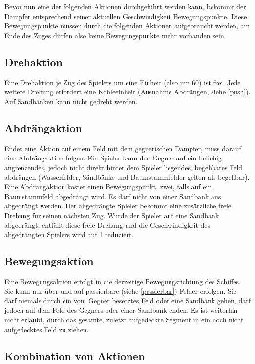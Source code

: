 \documentclass[12pt,a4paper, ngerman, oneside]{scrartcl}
\begin{document}
Bevor nun eine der folgenden Aktionen durchgeführt werden kann, bekommt der
Dampfer entsprechend seiner aktuellen Geschwindigkeit Bewegungspunkte. Diese
Bewegungspunkte müssen durch die folgenden Aktionen aufgebraucht werden, am Ende
des Zuges dürfen also keine Bewegungspunkte mehr vorhanden sein.

\subsection{\label{turn}Drehaktion}

Eine Drehaktion je Zug des Spielers um eine Einheit (also um 60\degree) ist
frei. Jede weitere Drehung erfordert eine Kohleeinheit (Ausnahme Abdrängen,
siehe \ref{push}). Auf Sandbänken kann nicht gedreht werden.


\subsection{\label{push}Abdrängaktion}

Endet eine Aktion auf einem Feld mit dem gegnerischen Dampfer, muss darauf eine
Abdrängaktion folgen. Ein Spieler kann den Gegner auf ein beliebig angrenzendes,
jedoch nicht direkt hinter dem Spieler liegendes, begehbares Feld abdrängen
(\label{passierbar}Wasserfelder, Sändbänke und Baumstammfelder gelten als
begehbar). Eine Abdrängaktion kostet einen Bewegungspunkt, zwei, falls auf ein
Baumstammfeld abgedrängt wird. Es darf nicht von einer Sandbank aus abgedrängt
werden. Der abgedrängte Spieler bekommt eine zusätzliche freie Drehung für
seinen nächsten Zug. Wurde der Spieler auf eine Sandbank abgedrängt, entfällt
diese freie Drehung und die Geschwindigkeit des abgedrängten Spielers wird auf 1
reduziert.

\subsection{\label{step}Bewegungsaktion}

Eine Bewegungsaktion erfolgt in die derzeitige Bewegungsrichtung des Schiffes.
Sie kann nur über und auf passierbare (siehe \ref{passierbar}) Felder erfolgen.
Sie darf niemals durch ein vom Gegner besetztes Feld oder eine Sandbank gehen,
darf jedoch auf dem Feld des Gegners oder einer Sandbank enden. Es ist weiterhin
nicht erlaubt, durch das gesamte, zuletzt aufgedeckte Segment in ein noch nicht
aufgedecktes Feld zu ziehen.

\subsection{Kombination von Aktionen}
\end{document}
